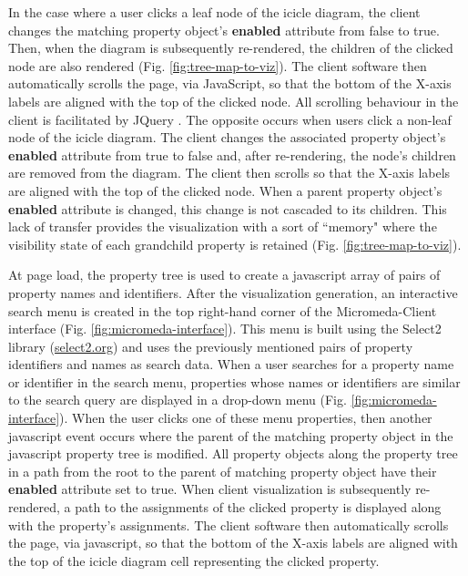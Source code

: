 In the case where a user clicks a leaf node of the icicle diagram, the client 
changes the matching property object's \textbf{enabled} attribute from false to 
true. Then, when the diagram is subsequently re-rendered, the children of the 
clicked node are also rendered (Fig. \ref{fig:tree-map-to-viz}). The client 
software then automatically scrolls the page, via JavaScript, so that the bottom 
of the X-axis labels are aligned with the top of the clicked node. All scrolling 
behaviour in the client is facilitated by JQuery \cite{li2012jquery}. The 
opposite occurs when users click a non-leaf node of the icicle diagram. The 
client changes the associated property object's \textbf{enabled} attribute from 
true to false and, after re-rendering, the node's children are removed from the 
diagram. The client then scrolls so that the X-axis labels are aligned with the 
top of the clicked node. When a parent property object's \textbf{enabled} 
attribute is changed, this change is not cascaded to its children. This lack of 
transfer provides the visualization with a sort of ``memory" where the 
visibility state of each grandchild property is retained (Fig. 
\ref{fig:tree-map-to-viz}).

At page load, the property tree is used to create a \gls{javascript} array of 
pairs of property names and identifiers. After the visualization generation, an 
interactive search menu is created in the top right-hand corner of the 
Micromeda-Client interface (Fig. \ref{fig:micromeda-interface}). This menu is 
built using the Select2 library \cite{select2} 
(\href{http://select2.org}{select2.org}) and uses the previously mentioned pairs 
of property identifiers and names as search data. When a user searches for a 
property name or identifier in the search menu, properties whose names or 
identifiers are similar to the search query are displayed in a drop-down menu 
(Fig. \ref{fig:micromeda-interface}). When the user clicks one of these menu 
properties, then another \gls{javascript} event occurs where the parent of the 
matching property object in the \gls{javascript} property tree is modified. All 
property objects along the property tree in a path from the root to the parent 
of matching property object have their \textbf{enabled} attribute set to true. 
When client visualization is subsequently re-rendered, a path to the assignments 
of the clicked property is displayed along with the property's assignments. The 
client software then automatically scrolls the page, via \gls{javascript}, so 
that the bottom of the X-axis labels are aligned with the top of the icicle 
diagram cell representing the clicked property.

